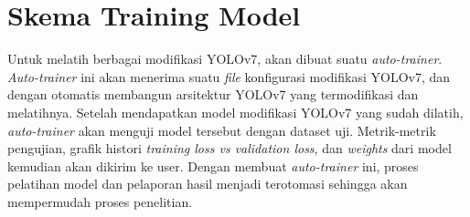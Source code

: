 




\section{Skema Training Model}
  Untuk melatih berbagai modifikasi YOLOv7, akan dibuat suatu \emph{auto-trainer}.
  \emph{Auto-trainer} ini akan menerima suatu \emph{file} konfigurasi modifikasi YOLOv7, dan dengan otomatis membangun arsitektur YOLOv7 yang termodifikasi dan melatihnya.
  Setelah mendapatkan model modifikasi YOLOv7 yang sudah dilatih, \emph{auto-trainer} akan menguji model tersebut dengan dataset uji.
  Metrik-metrik pengujian, grafik histori \emph{training loss vs validation loss}, dan \emph{weights} dari model kemudian akan dikirim ke user.
  Dengan membuat \emph{auto-trainer} ini, proses pelatihan model dan pelaporan hasil menjadi terotomasi sehingga akan mempermudah proses penelitian.

